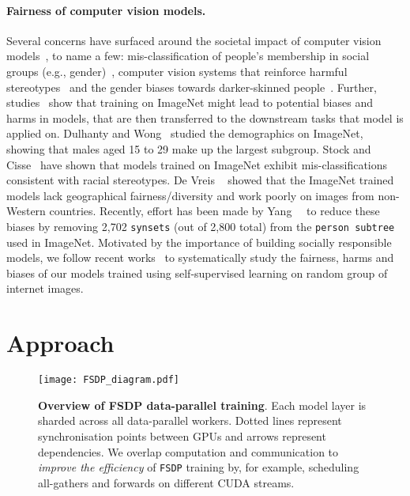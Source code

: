 \documentclass[10pt,twocolumn,letterpaper]{article}
\begin{document}
\paragraph{Fairness of computer vision models.} Several concerns have surfaced around the societal impact of computer vision models~\cite{dentongebru2020}, to name a few:
mis-classification of people’s membership in social groups (e.g., gender)~\cite{pinar2021,keyes2018}, computer vision systems that reinforce harmful stereotypes~\cite{doi:10.1177/2378023120967171,bhargava2019exposing} and the gender biases towards darker-skinned people~\cite{buolamwini2018gender}. 
Further, studies~\cite{yang2020towards} show that training on ImageNet might lead to potential biases and harms in models, that are then transferred to the downstream tasks that model is applied on. 
Dulhanty and Wong~\cite{dulhanty2019auditing} studied the demographics on ImageNet, showing that males aged 15 to 29 make up the largest subgroup. 
Stock and Cisse~\cite{stock2018convnets} have shown that models trained on ImageNet exhibit mis-classifications consistent with racial stereotypes. 
De Vreis \etal~\cite{de2019does} showed that the ImageNet trained models lack geographical fairness/diversity and work poorly on images from non-Western countries. 
Recently, effort has been made by Yang~\etal~\cite{yang2020towards} to reduce these biases by removing 2,702 \texttt{synsets} (out of 2,800 total) from the \texttt{person subtree} used in ImageNet. 
Motivated by the importance of building socially responsible models, we follow recent works~\cite{goyal2022fairness} to systematically study the fairness, harms and biases of our models trained using self-supervised learning on random group of internet images.



\section{Approach}

\begin{figure}[t]
        \centering
\texttt{[image: FSDP\_diagram.pdf]}
        
        \caption{
          \textbf{Overview of FSDP data-parallel training}. Each model layer is sharded across all data-parallel workers. Dotted lines represent synchronisation points between GPUs and arrows represent dependencies. We overlap computation and communication to \textit{improve the efficiency} of \texttt{FSDP} training by, for example, scheduling all-gathers and forwards on different CUDA streams.
        }
        \label{fig:fsdp_diagram_and_activation_checkpoint} 
\end{figure}
\end{document}
